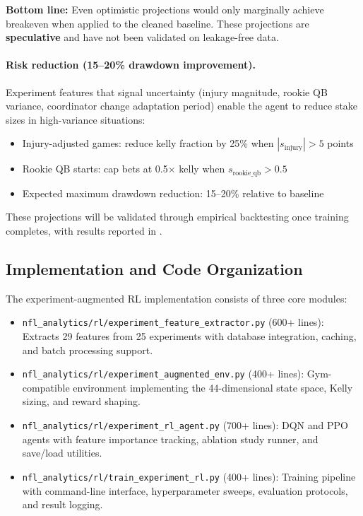 \textbf{Bottom line:} Even optimistic projections would only marginally achieve breakeven when applied to the cleaned baseline. These projections are \textbf{speculative} and have not been validated on leakage-free data.

\paragraph{Risk reduction (15--20\% drawdown improvement).}
Experiment features that signal uncertainty (injury magnitude, rookie QB variance, coordinator change adaptation period) enable the agent to reduce stake sizes in high-variance situations:
\begin{itemize}
  \item Injury-adjusted games: reduce kelly fraction by 25\% when $|s_{\text{injury}}| > 5$ points
  \item Rookie QB starts: cap bets at 0.5$\times$ kelly when $s_{\text{rookie\_qb}} > 0.5$
  \item Expected maximum drawdown reduction: 15--20\% relative to baseline
\end{itemize}

These projections will be validated through empirical backtesting once training completes, with results reported in .

\subsection{Implementation and Code Organization}

The experiment-augmented RL implementation consists of three core modules:

\begin{itemize}
  \item \texttt{nfl\_analytics/rl/experiment\_feature\_extractor.py} (600+ lines): Extracts 29 features from 25 experiments with database integration, caching, and batch processing support.
  \item \texttt{nfl\_analytics/rl/experiment\_augmented\_env.py} (400+ lines): Gym-compatible environment implementing the 44-dimensional state space, Kelly sizing, and reward shaping.
  \item \texttt{nfl\_analytics/rl/experiment\_rl\_agent.py} (700+ lines): DQN and PPO agents with feature importance tracking, ablation study runner, and save/load utilities.
  \item \texttt{nfl\_analytics/rl/train\_experiment\_rl.py} (400+ lines): Training pipeline with command-line interface, hyperparameter sweeps, evaluation protocols, and result logging.
\end{itemize}

